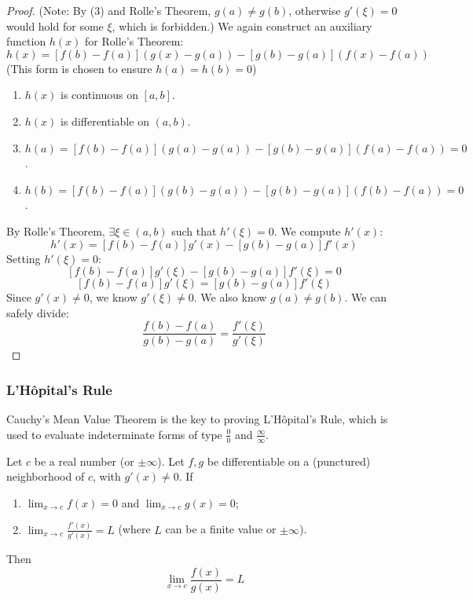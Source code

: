 \begin{proof}
(Note: By (3) and Rolle's Theorem, $g(a) \neq g(b)$, otherwise $g'(\xi)=0$ would hold for some $\xi$, which is forbidden.)
We again construct an auxiliary function $h(x)$ for Rolle's Theorem:
\[
h(x) = [f(b) - f(a)](g(x) - g(a)) - [g(b) - g(a)](f(x) - f(a))
\]
(This form is chosen to ensure $h(a)=h(b)=0$)
\begin{enumerate}
    \item $h(x)$ is continuous on $[a, b]$.
    \item $h(x)$ is differentiable on $(a, b)$.
    \item $h(a) = [f(b) - f(a)](g(a) - g(a)) - [g(b) - g(a)](f(a) - f(a)) = 0$.
    \item $h(b) = [f(b) - f(a)](g(b) - g(a)) - [g(b) - g(a)](f(b) - f(a)) = 0$.
\end{enumerate}
By Rolle's Theorem, $\exists \xi \in (a, b)$ such that $h'(\xi) = 0$.
We compute $h'(x)$:
\[
h'(x) = [f(b) - f(a)]g'(x) - [g(b) - g(a)]f'(x)
\]
Setting $h'(\xi) = 0$:
\[
[f(b) - f(a)]g'(\xi) - [g(b) - g(a)]f'(\xi) = 0
\]
\[
[f(b) - f(a)]g'(\xi) = [g(b) - g(a)]f'(\xi)
\]
Since $g'(x) \neq 0$, we know $g'(\xi) \neq 0$. We also know $g(a) \neq g(b)$. We can safely divide:
\[
\frac{f(b) - f(a)}{g(b) - g(a)} = \frac{f'(\xi)}{g'(\xi)}
\]
\end{proof}

\subsubsection{L'Hôpital's Rule}

Cauchy's Mean Value Theorem is the key to proving L'Hôpital's Rule, which is used to evaluate indeterminate forms of type $\frac{0}{0}$ and $\frac{\infty}{\infty}$.

\begin{theorem}
\label{thm:lhopital_zero_en}
Let $c$ be a real number (or $\pm\infty$). Let $f, g$ be differentiable on a (punctured) neighborhood of $c$, with $g'(x) \neq 0$.
If
\begin{enumerate}
    \item $\lim_{x \to c} f(x) = 0$ and $\lim_{x \to c} g(x) = 0$;
    \item $\lim_{x \to c} \frac{f'(x)}{g'(x)} = L$ (where $L$ can be a finite value or $\pm\infty$).
\end{enumerate}
Then
\[
\lim_{x \to c} \frac{f(x)}{g(x)} = L
\]
\end{theorem}

